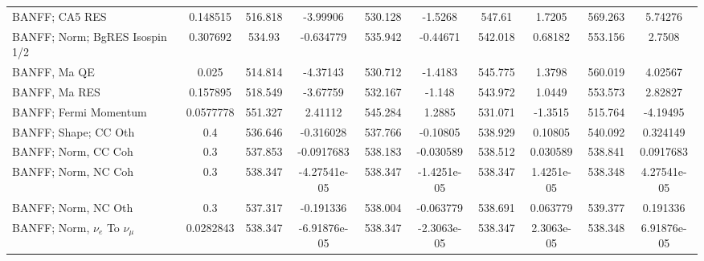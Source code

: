 \documentclass{standalone}
\begin{document}
\begin{tabular}{| l | S | S  S | S  S | S  S | S  S | }
                                                                  BANFF; CA5 RES &        0.148515 &         516.818 &        -3.99906 &         530.128 &         -1.5268 &          547.61 &          1.7205 &         569.263 &         5.74276 \\ 
                                                  BANFF; Norm; BgRES Isospin 1/2 &        0.307692 &          534.93 &       -0.634779 &         535.942 &        -0.44671 &         542.018 &         0.68182 &         553.156 &          2.7508 \\ 
                                                                    BANFF, Ma QE &           0.025 &         514.814 &        -4.37143 &         530.712 &         -1.4183 &         545.775 &          1.3798 &         560.019 &         4.02567 \\ 
                                                                   BANFF, Ma RES &        0.157895 &         518.549 &        -3.67759 &         532.167 &          -1.148 &         543.972 &          1.0449 &         553.573 &         2.82827 \\ 
                                                           BANFF; Fermi Momentum &       0.0577778 &         551.327 &         2.41112 &         545.284 &          1.2885 &         531.071 &         -1.3515 &         515.764 &        -4.19495 \\ 
                                                            BANFF; Shape; CC Oth &             0.4 &         536.646 &       -0.316028 &         537.766 &        -0.10805 &         538.929 &         0.10805 &         540.092 &        0.324149 \\ 
                                                             BANFF; Norm, CC Coh &             0.3 &         537.853 &      -0.0917683 &         538.183 &       -0.030589 &         538.512 &        0.030589 &         538.841 &       0.0917683 \\ 
                                                             BANFF; Norm, NC Coh &             0.3 &         538.347 &    -4.27541e-05 &         538.347 &     -1.4251e-05 &         538.347 &      1.4251e-05 &         538.348 &     4.27541e-05 \\ 
                                                             BANFF; Norm, NC Oth &             0.3 &         537.317 &       -0.191336 &         538.004 &       -0.063779 &         538.691 &        0.063779 &         539.377 &        0.191336 \\ 
                                           BANFF; Norm, $\nu_{e}$ To $\nu_{\mu}$ &       0.0282843 &         538.347 &    -6.91876e-05 &         538.347 &     -2.3063e-05 &         538.347 &      2.3063e-05 &         538.348 &     6.91876e-05 \\ 

\end{tabular}
\end{document}
